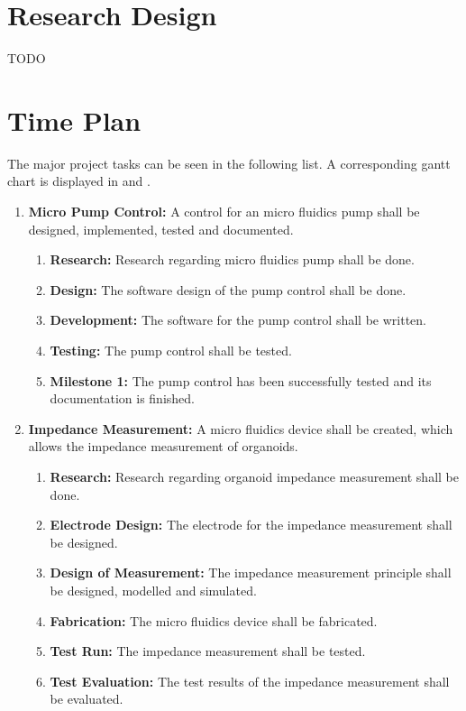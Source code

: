 \section{Research Design}
TODO
\section{Time Plan}

The major project tasks can be seen in the following list. A corresponding gantt chart is displayed in  and . 
\begin{enumerate}
\item \textbf{Micro Pump Control:} A control for an micro fluidics pump shall be designed, implemented, tested and documented.
    \begin{enumerate}
        \item \textbf{Research:} Research regarding micro fluidics pump shall be done. 
        \item \textbf{Design:} The software design of the pump control shall be done.
        \item \textbf{Development:} The software for the pump control shall be written.
        \item \textbf{Testing:} The pump control shall be tested.
        \item \textbf{Milestone 1:} The pump control has been successfully tested and its documentation is finished.
    \end{enumerate}
\item \textbf{Impedance Measurement:} A micro fluidics device shall be created, which allows the impedance measurement of organoids.
    \begin{enumerate}
        \item \textbf{Research:} Research regarding organoid impedance measurement shall be done. 
        \item \textbf{Electrode Design:} The electrode for the impedance measurement shall be designed.
        \item \textbf{Design of Measurement:} The impedance measurement principle shall be designed, modelled and simulated.
        \item \textbf{Fabrication:} The micro fluidics device shall be fabricated.
        \item \textbf{Test Run:} The impedance measurement shall be tested.
        \item \textbf{Test Evaluation:} The test results of the impedance measurement shall be evaluated.

\end{enumerate}
\end{enumerate}
